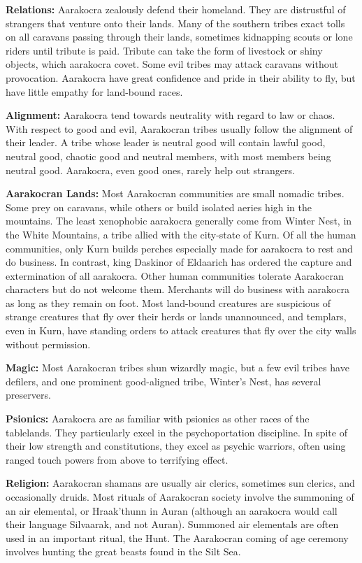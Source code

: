\textbf{Relations:} Aarakocra zealously defend their homeland. They are distrustful of strangers that venture onto their lands. Many of the southern tribes exact tolls on all caravans passing through their lands, sometimes kidnapping scouts or lone riders until tribute is paid. Tribute can take the form of livestock or shiny objects, which aarakocra covet. Some evil tribes may attack caravans without provocation. Aarakocra have great confidence and pride in their ability to fly, but have little empathy for land-bound races.

\textbf{Alignment:} Aarakocra tend towards neutrality with regard to law or chaos. With respect to good and evil, Aarakocran tribes usually follow the alignment of their leader. A tribe whose leader is neutral good will contain lawful good, neutral good, chaotic good and neutral members, with most members being neutral good. Aarakocra, even good ones, rarely help out strangers.

\textbf{Aarakocran Lands:} Most Aarakocran communities are small nomadic tribes. Some prey on caravans, while others or build isolated aeries high in the mountains. The least xenophobic aarakocra generally come from Winter Nest, in the White Mountains, a tribe allied with the city-state of Kurn. Of all the human communities, only Kurn builds perches especially made for aarakocra to rest and do business. In contrast, king Daskinor of Eldaarich has ordered the capture and extermination of all aarakocra. Other human communities tolerate Aarakocran characters but do not welcome them. Merchants will do business with aarakocra as long as they remain on foot. Most land-bound creatures are suspicious of strange creatures that fly over their herds or lands unannounced, and templars, even in Kurn, have standing orders to attack creatures that fly over the city walls without permission.

\textbf{Magic:} Most Aarakocran tribes shun wizardly magic, but a few evil tribes have defilers, and one prominent good-aligned tribe, Winter's Nest, has several preservers.

\textbf{Psionics:} Aarakocra are as familiar with psionics as other races of the tablelands. They particularly excel in the psychoportation discipline. In spite of their low strength and constitutions, they excel as psychic warriors, often using ranged touch powers from above to terrifying effect.

\textbf{Religion:} Aarakocran shamans are usually air clerics, sometimes sun clerics, and occasionally druids. Most rituals of Aarakocran society involve the summoning of an air elemental, or Hraak'thunn in Auran (although an aarakocra would call their language Silvaarak, and not Auran). Summoned air elementals are often used in an important ritual, the Hunt. The Aarakocran coming of age ceremony involves hunting the great beasts found in the Silt Sea.

